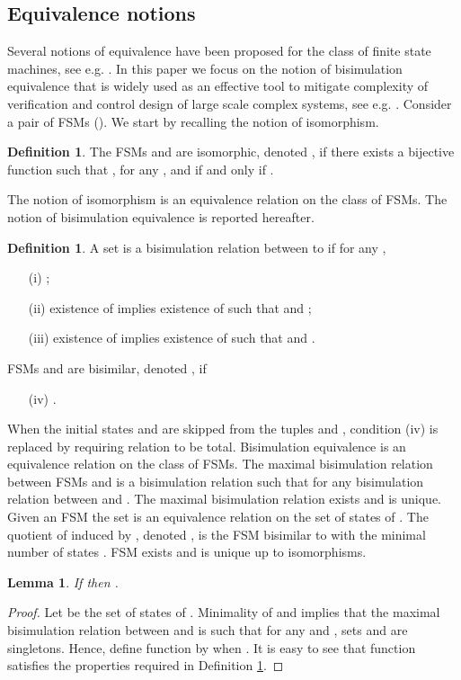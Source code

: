 \documentclass{amsart}
\newtheorem{lemma}[theorem]{Lemma}
\theoremstyle{definition}
\newtheorem{definition}[theorem]{Definition}
\theoremstyle{remark}
\numberwithin{equation}{section}
\begin{document}
\subsection{Equivalence notions}
Several notions of equivalence have been proposed for the class of finite state machines, see e.g. \cite{Spectrum}. 
In this paper we focus on the notion of bisimulation equivalence \cite{Milner,Park} that 
is widely used as an effective tool to mitigate complexity of verification and control design of large scale complex systems, see e.g. \cite{ModelChecking}. 
Consider a pair of FSMs  (). 
We start by recalling the notion of isomorphism. 
\begin{definition}
\label{DefIso}
The FSMs  and  are isomorphic, denoted , if there exists a bijective function  such that 
,  for any , and  if and only if . 
\end{definition}
The notion of isomorphism is an equivalence relation on the class of FSMs. 
The notion of bisimulation equivalence is reported hereafter.
\begin{definition}
\label{Bis} 
A set  is a bisimulation relation between  to  if for any ,
\begin{itemize}
\item[(i)] ;
\item[(ii)] existence of  implies existence of  such that  and ;
\item[(iii)] existence of  implies existence of  such that  and .
\end{itemize}
FSMs  and  are bisimilar, denoted , if 
\begin{itemize}
\item[(iv)] \mbox{}.
\end{itemize}
\end{definition}

When the initial states  and  are skipped from the tuples  and , condition (iv) is replaced by requiring relation  to be total. 
Bisimulation equivalence is an equivalence relation on the class of FSMs. 
The maximal bisimulation relation between FSMs  and  is a bisimulation relation  such that  for any bisimulation relation  between  and . The maximal bisimulation relation exists and is unique. Given an  FSM  the set  is an equivalence relation on the set of states of . 
The quotient of  induced by , denoted , is the FSM bisimilar to  with the minimal number of states \cite{ModelChecking}. FSM  exists and is unique up to isomorphisms.
\begin{lemma}
\label{lemma}
If  then .
\end{lemma}
\begin{proof}
Let  be the set of states of . 
Minimality of  and  implies that the maximal bisimulation relation  between  and  is such that for any  and , sets  and  are singletons. Hence, define function  by  when . It is easy to see that function  satisfies the properties required in Definition \ref{DefIso}.
\end{proof}
\end{document}
